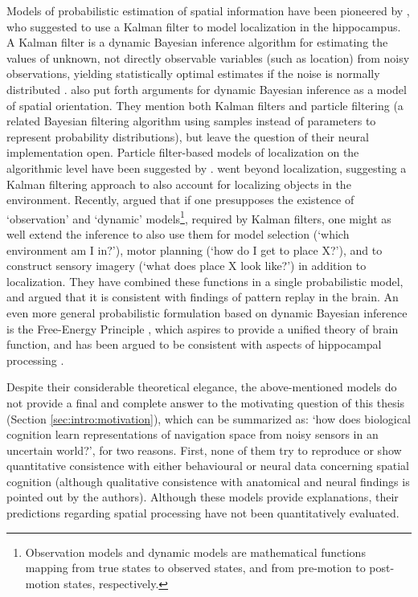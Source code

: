 
Models of probabilistic estimation of spatial information have been pioneered by \citep{bousquet1997hippocampus}, who suggested to use a Kalman filter to model localization in the hippocampus. A Kalman filter is a dynamic Bayesian inference algorithm for estimating the values of unknown, not directly observable variables (such as location) from noisy observations, yielding statistically optimal estimates if the noise is normally distributed \citep{kalman1960new}. \citet{macneilage2008computational} also put forth arguments for dynamic Bayesian inference as a model of spatial orientation. They mention both Kalman filters and particle filtering (a related Bayesian filtering algorithm using samples instead of parameters to represent probability distributions), but leave the question of their neural implementation open. Particle filter-based models of localization on the algorithmic level have been suggested by \citep{fox2010hippocampus, cheung2012maintaining}. \citet{osborn2010kalman} went beyond localization, suggesting a Kalman filtering approach to also account for localizing objects in the environment. Recently, \citet{penny2013forward} argued that if one presupposes the existence of `observation' and `dynamic' models\footnote{Observation models and dynamic models are mathematical functions mapping from true states to observed states, and from pre-motion to post-motion states, respectively.}, required by Kalman filters, one might as well extend the inference to also use them for model selection (`which environment am I in?'), motor planning (`how do I get to place X?'), and to construct sensory imagery (`what does place X look like?') in addition to localization. They have combined these functions in a single probabilistic model, and argued that it is consistent with findings of pattern replay in the brain. An even more general probabilistic formulation based on dynamic Bayesian inference is the Free-Energy Principle \citep{friston2006free}, which aspires to provide a unified theory of brain function, and has been argued to be consistent with aspects of hippocampal processing \citep{friston2011action}.

Despite their considerable theoretical elegance, the above-mentioned models do not provide a final and complete answer to the motivating question of this thesis (Section \ref{sec:intro:motivation}), which can be summarized as: `how does biological cognition learn representations of navigation space from noisy sensors in an uncertain world?', for two reasons. First, none of them try to reproduce or show quantitative consistence with either behavioural or neural data concerning spatial cognition (although qualitative consistence with anatomical and neural findings is pointed out by the authors). Although these models provide explanations, their predictions regarding spatial processing have not been quantitatively evaluated.


